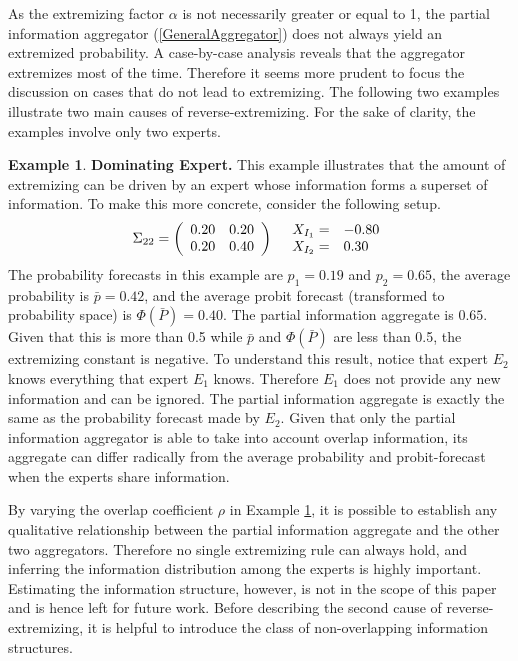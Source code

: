 \documentclass[11pt]{article}
\theoremstyle{definition}
\newtheorem{example}[theorem]{Example}
\theoremstyle{definition}
\begin{document}
As the extremizing factor $\alpha$ is not necessarily greater or equal to 1, the partial information aggregator (\ref{GeneralAggregator}) does not always yield an extremized probability. A case-by-case analysis reveals that the aggregator extremizes most of the time. Therefore it seems more prudent to focus the discussion on cases that do not lead to extremizing. The following two examples illustrate two main causes of reverse-extremizing. For the sake of clarity, the examples involve only two experts. 



\begin{example}
\label{Example1}
\textbf{Dominating Expert.} This example illustrates that the amount of extremizing can be driven by an expert whose information forms a superset of information. To make this more concrete, consider the following setup.
\begin{align*}
\Sigma_{22} =  \left(\begin{array}{c c}
0.20 & 0.20\\
0.20 & 0.40 \\
 \end{array}\right)
  && 
  \begin{array}{l l}
X_{I_1} =& -0.80\\
X_{I_2} =& 0.30
 \end{array}
\end{align*}
The probability forecasts in this example are $p_1 = 0.19$ and $p_2 = 0.65$, the average probability is $\bar{p} = 0.42$, and the average probit forecast (transformed to probability space) is $\Phi(\bar{P}) = 0.40$. 
The partial information aggregate is $0.65$.  Given that this is more than 0.5 while $\bar{p}$ and $\Phi(\bar{P})$ are less than 0.5, the extremizing constant is negative. To understand this result, notice that expert $E_2$ knows everything that expert $E_1$ knows. Therefore $E_1$ does not provide any new information and can be ignored. The partial information aggregate is exactly the same as the probability forecast made by $E_2$. Given that only the partial information aggregator is able to take into account overlap information, its aggregate can differ radically from the average probability and probit-forecast when the experts share information.
\end{example}

By varying the overlap coefficient $\rho$ in Example \ref{Example1}, it is possible to establish any qualitative relationship between the partial information aggregate and the other two aggregators. Therefore no single extremizing rule can always hold, and inferring the information distribution among the experts is highly important. Estimating the information structure, however, is not in the scope of this paper and is hence left for future work. Before describing the second cause of reverse-extremizing, it is helpful to introduce the class of non-overlapping information structures. 
\end{document}
